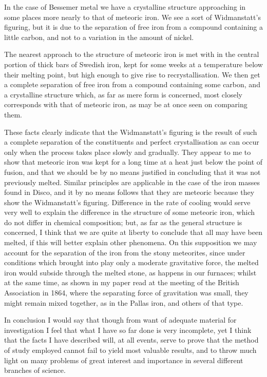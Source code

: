 \documentclass[a4paper, 12pt, oneside]{article}
\begin{document}
In the case of Bessemer metal we have a crystalline structure approaching in some places more nearly to that of meteoric iron. We see a sort of Widmanstatt's figuring, but it is due to the separation of free iron from a compound containing a little carbon, and not to a variation in the amount of nickel.

The nearest approach to the structure of meteoric iron is met with in the central portion of thick bars of Swedish iron, kept for some weeks at a temperature below their melting point, but high enough to give rise to recrystallisation. We then get a complete separation of free iron from a compound containing some carbon, and a crystalline structure which, as far as mere form is concerned, most closely corresponds with that of meteoric iron, as may be at once seen on comparing them.

These facts clearly indicate that the Widmanstatt's figuring is the result of such a complete separation of the constituents and perfect crystallisation as can occur only when the process takes place slowly and gradually. They appear to me to show that meteoric iron was kept for a long time at a heat just below the point of fusion, and that we should be by no means justified in concluding that it was not previously melted. Similar principles are applicable in the case of the iron masses found in Disco, and it by no means follows that they are meteoric because they show the Widmanstatt's figuring. Difference in the rate of cooling would serve very well to explain the difference in the structure of some meteoric iron, which do not differ in chemical composition; but, as far as the general structure is concerned, I think that we are quite at liberty to conclude that all may have been melted, if this will better explain other phenomena. On this supposition we may account for the separation of the iron from the stony meteorites, since under conditions which brought into play only a moderate gravitative force, the melted iron would subside through the melted stone, as happens in our furnaces; whilst at the same time, as shown in my paper read at the meeting of the British Association in 1864, where the separating force of gravitation was small, they might remain mixed together, as in the Pallas iron, and others of that type.

In conclusion I would say that though from want of adequate material for investigation I feel that what I have so far done is very incomplete, yet I think that the facts I have described will, at all events, serve to prove that the method of study employed cannot fail to yield most valuable results, and to throw much light on many problems of great interest and importance in several different branches of science.
\clearpage
\end{document}
